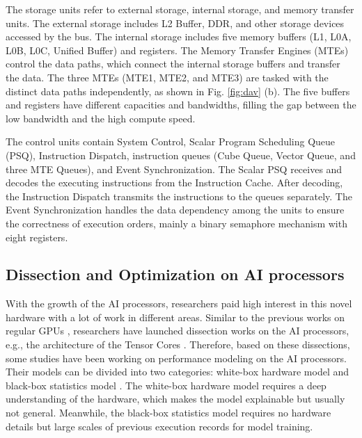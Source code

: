\documentclass[12pt]{extbook}
\begin{document}
The storage units refer to external storage, internal storage, and memory transfer units. The external storage includes L2 Buffer, DDR, and other storage devices accessed by the bus. The internal storage includes five memory buffers (L1, L0A, L0B, L0C, Unified Buffer) and registers. The Memory Transfer Engines (MTEs) control the data paths, which connect the internal storage buffers and transfer the data. The three MTEs (MTE1, MTE2, and MTE3) are tasked with the distinct data paths independently, as shown in Fig. \ref{fig:dav} (b). The five buffers and registers have different capacities and bandwidths, filling the gap between the low bandwidth and the high compute speed. 
    
The control units contain System Control, Scalar Program Scheduling Queue (PSQ), Instruction Dispatch, instruction queues (Cube Queue, Vector Queue, and three MTE Queues), and Event Synchronization. The Scalar PSQ receives and decodes the executing instructions from the Instruction Cache. After decoding, the Instruction Dispatch transmits the instructions to the queues separately. The Event Synchronization handles the data dependency among the units to ensure the correctness of execution orders, mainly a binary semaphore mechanism with eight registers. 

\subsection{Dissection and Optimization on AI processors}
\label{Sec:1_1_3}

With the growth of the AI processors, researchers paid high interest in this novel hardware with a lot of work in different areas. Similar to the previous works on regular GPUs \cite{DBLP:conf/ppopp/ZhangTXLZC17}, researchers have launched dissection works on the AI processors, e.g., the architecture of the Tensor Cores \cite{DBLP:journals/corr/abs-1804-06826}. Therefore, based on these dissections, some studies have been working on performance modeling on the AI processors. Their models can be divided into two categories: white-box hardware model \cite{DBLP:conf/ispass/RaihanGA19} and black-box statistics model \cite{DBLP:conf/nips/ChenZYJMCGK18, DBLP:journals/corr/abs-2008-01040}. The white-box hardware model requires a deep understanding of the hardware, which makes the model explainable but usually not general. Meanwhile, the black-box statistics model requires no hardware details but large scales of previous execution records for model training. 
\end{document}
